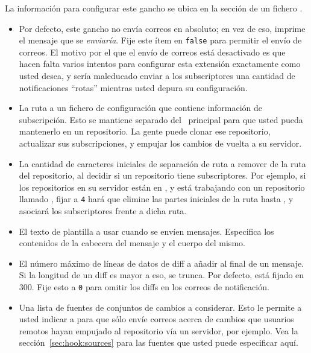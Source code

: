 La información para configurar este gancho se ubica en la sección
 de un fichero \hgrc.
\begin{itemize}
\item[\rcitem{notify}{test}] Por defecto, este gancho no envía correos
  en absoluto; en vez de eso, imprime el mensaje que se
  \emph{enviaría}. Fije este ítem en \texttt{false} para permitir el
  envío de correos. El motivo por el que el envío de correos está
  desactivado es que hacen falta varios intentos para configurar esta
  extensión exactamente como usted desea, y sería maleducado enviar a
  los subscriptores una cantidad de notificaciones ``rotas'' mientras
  usted depura su configuración.
\item[\rcitem{notify}{config}] La ruta a un fichero de configuración
  que contiene información de subscripción. Esto se mantiene separado
  del \hgrc\ principal para que usted pueda mantenerlo en un
  repositorio. La gente puede clonar ese repositorio, actualizar sus
  subscripciones, y empujar los cambios de vuelta a su servidor.
\item[\rcitem{notify}{strip}] La cantidad de caracteres iniciales de
  separación de ruta a remover de la ruta del repositorio, al decidir
  si un repositorio tiene subscriptores. Por ejemplo, si los
  repositorios en su servidor están en , y
   está trabajando con un repositorio llamado
  , fijar  a
  \texttt{4} hará que  elimine las partes iniciales de
  la ruta hasta , y asociará los subscriptores
  frente a dicha ruta.
\item[\rcitem{notify}{template}] El texto de plantilla a usar cuando
  se envíen mensajes. Especifica los contenidos de la cabecera del
  mensaje y el cuerpo del mismo.
\item[\rcitem{notify}{maxdiff}] El número máximo de líneas de datos de
  diff a añadir al final de un mensaje. Si la longitud de un diff es
  mayor a eso, se trunca. Por defecto, está fijado en 300. Fije esto a 
  \texttt{0} para omitir los diffs en los correos de notificación.
\item[\rcitem{notify}{sources}] Una lista de fuentes de conjuntos de
  cambios a considerar. Esto le permite a usted indicar a
   para que sólo envíe correos acerca de cambios que
  usuarios remotos hayan empujado al repositorio vía un servidor, por
  ejemplo.  Vea la sección~\ref{sec:hook:sources} para las fuentes que
  usted puede especificar aquí.
\end{itemize}

